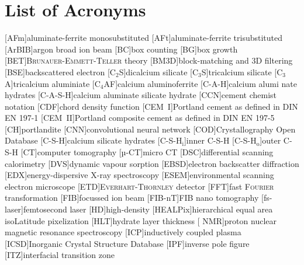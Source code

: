 
\chapter*{List of Acronyms}

\begin{acronym}[LA-ICP-MS]\itemsep=0pt
	[AFm]{aluminate-ferrite monosubstituted}
	[AFt]{aluminate-ferrite trisubstituted}
	[ArBIB]{argon broad ion beam}
	[BC]{box counting}
	[BG]{box growth}
	[BET]{B\textsc{runauer}-\textsc{Emmett}-\textsc{Teller} theory}
	[BM3D]{block-matching and 3D filtering}
	[BSE]{backscattered electron}
	[C$_2$S]{dicalcium silicate}
	[C$_3$S]{tricalcium silicate}
	[C$_3$A]{tricalcium aluminiate}
	[C$_4$AF]{calcium aluminoferrite}
	[C\hbox{-}A\hbox{-}H\xspace]{calcium alumi nate hydrates}
	[C\hbox{-}A\hbox{-}S\hbox{-}H]{calcium aluminate silicate hydrate} 
	[CCN]{cement chemist notation}
	[CDF]{chord density function} 
	[CEM~I]{Portland cement as defined in DIN EN 197-1} 
	[CEM~II]{Portland composite cement as defined in DIN EN 197-5} 
	[CH]{portlandite}
	[CNN]{convolutional neural network}
	[COD]{Crystallography Open Database}
	[C\hbox{-}S\hbox{-}H\xspace]{calcium silicate hydrates}
	[C-S-H$_\text{i}$]{inner C\hbox{-}S\hbox{-}H}
	[C-S-H$_\text{o}$]{outer C\hbox{-}S\hbox{-}H}
	[CT]{computer tomography}
	[µ-CT]{micro CT}
	[DSC]{differential scanning calorimetry}
	[DVS]{dynamic vapour sorption}
	[EBSD]{electron backscatter diffraction}
	[EDX]{energy-dispersive X-ray spectroscopy}
	[ESEM]{environmental scanning electron microscope}
	[ETD]{E\textsc{verhart}-\textsc{Thornley} detector}
	[FFT]{fast \textsc{Fourier} transformation}
	[FIB]{focussed ion beam}
	[FIB-nT]{FIB nano tomography}
	[fs-laser]{femtosecond laser}
	[HD]{high-density}
	[HEALPix]{hierarchical equal area isoLatitude pixelization}
	[HLT]{hydrate layer thickness}
	[ NMR]{proton nuclear magnetic resonance spectroscopy}
	[ICP]{inductively coupled plasma}
	[ICSD]{Inorganic Crystal Structure Database}
	[IPF]{inverse pole figure}
	[ITZ]{interfacial transition zone}

\end{acronym}
